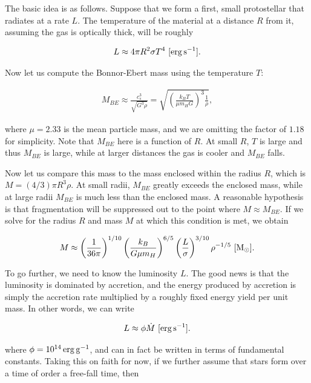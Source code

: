\documentclass[a4paper,10pt]{article}
\begin{document}
{\noindent}The basic idea is as follows. Suppose that we form a first, small protostellar that radiates at a rate $L$. The temperature of the material at a distance $R$ from it, assuming the gas is optically thick, will be roughly

\begin{align*}
    L\approx 4\pi R^2\sigma T^4 ~ [{\rm erg\,s^{-1}}].
\end{align*}

{\noindent}Now let us compute the Bonnor-Ebert mass using the temperature $T$:

\begin{align*}
    M_{BE} \approx \frac{c_s^3}{\sqrt{G^3\rho}} = \sqrt{\left(\frac{k_BT}{\mu m_HG}\right)^3\frac{1}{\rho}},
\end{align*}

{\noindent}where $\mu=2.33$ is the mean particle mass, and we are omitting the factor of $1.18$ for simplicity. Note that $M_{BE}$ here is a function of $R$. At small $R$, $T$ is large and thus $M_{BE}$ is large, while at larger distances the gas is cooler and $M_{BE}$ falls.

{\noindent}Now let us compare this mass to the mass enclosed within the radius $R$, which is $M=(4/3)\pi R^3\rho$. At small radii, $M_{BE}$ greatly exceeds the enclosed mass, while at large radii $M_{BE}$ is much less than the enclosed mass. A reasonable hypothesis is that fragmentation will be suppressed out to the point where $M\approx M_{BE}$. If we solve for the radius $R$ and mass $M$ at which this condition is met, we obtain

\begin{align*}
    M\approx \left(\frac{1}{36\pi}\right)^{1/10} \left(\frac{k_B}{G\mu m_H}\right)^{6/5} \left(\frac{L}{\sigma}\right)^{3/10} \rho^{-1/5} ~ [{\rm M_\odot}].
\end{align*}

{\noindent}To go further, we need to know the luminosity $L$. The good news is that the luminosity is dominated by accretion, and the energy produced by accretion is simply the accretion rate multiplied by a roughly fixed energy yield per unit mass. In other words, we can write

\begin{align*}
    L \approx \phi\dot{M} ~ [{\rm erg\,s^{-1}}].
\end{align*}

{\noindent}where $\phi=10^{14}\,{\rm erg\,g^{-1}}$, and can in fact be written in terms of fundamental constants. Taking this on faith for now, if we further assume that stars form over a time of order a free-fall time, then
\end{document}
